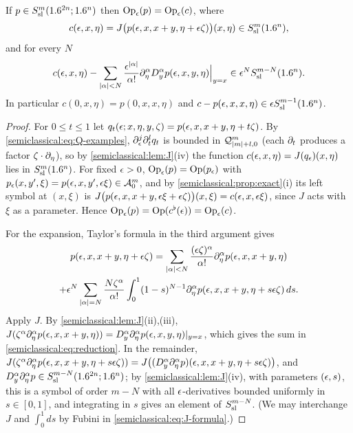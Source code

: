 \begin{theorem}[Reduction]\label{semiclassical:thm:reduction}
  If $p\in S^{m}_{\mathrm{sl}}(1.6^{2n};1.6^n)$ then $\operatorname{Op}_\epsilon(p)=\operatorname{Op}_\epsilon(c)$, where
  \begin{equation*}
    c(\epsilon,x,\eta)=J\bigl(p(\epsilon,x,x+y,\eta+\epsilon\zeta)\bigr)(x,\eta)\in S^{m}_{\mathrm{sl}}(1.6^n),
  \end{equation*}
  and for every $N$
  \begin{equation}\label{semiclassical:eq:reduction}
    c(\epsilon,x,\eta)-\sum_{\lvert \alpha\rvert<N}\frac{\epsilon^{\lvert \alpha\rvert}}{\alpha!}
    \partial^\alpha_\eta D^\alpha_yp(\epsilon,x,y,\eta)\Big|_{y=x}\in\epsilon^NS^{m-N}_{\mathrm{sl}}(1.6^n).
  \end{equation}
  In particular $c(0,x,\eta)=p(0,x,x,\eta)$ and $c-p(\epsilon,x,x,\eta)\in\epsilon S^{m-1}_{\mathrm{sl}}(1.6^n)$.
\end{theorem}
\begin{proof}
  For $0\le t\le1$ let $q_t(\epsilon;x,\eta,y,\zeta)=p(\epsilon,x,x+y,\eta+t\zeta)$. By
  \eqref{semiclassical:eq:Q-examples}, $\partial^j_\epsilon\partial^l_tq_t$ is bounded in
  $\mathcal{Q}^{m}_{\lvert m\rvert+l,0}$ (each $\partial_t$ produces a factor $\zeta\cdot\partial_\eta$), so by
  \cref{semiclassical:lem:J}(iv) the function $c(\epsilon,x,\eta)=J(q_\epsilon)(x,\eta)$
  lies in $S^{m}_{\mathrm{sl}}(1.6^n)$. For fixed $\epsilon>0$, $\operatorname{Op}_\epsilon(p)=\operatorname{Op}(p_\epsilon)$ with
  $p_\epsilon(x,y',\xi)=p(\epsilon,x,y',\epsilon\xi)\in\mathcal{A}^{m}_{0}$, and by
  \cref{semiclassical:prop:exact}(i) its left symbol at $(x,\xi)$ is
  $J\bigl(p(\epsilon,x,x+y,\epsilon\xi+\epsilon\zeta)\bigr)(x,\xi)=c(\epsilon,x,\epsilon\xi)$, since
  $J$ acts with $\xi$ as a parameter. Hence $\operatorname{Op}_\epsilon(p)=\operatorname{Op}(c^\flat(\epsilon))=\operatorname{Op}_\epsilon(c)$.

  For the expansion, Taylor's formula in the third argument gives
  \begin{multline*}
    p(\epsilon,x,x+y,\eta+\epsilon\zeta)=\sum_{\lvert \alpha\rvert<N}\frac{(\epsilon\zeta)^\alpha}{\alpha!}
    \partial^\alpha_\eta p(\epsilon,x,x+y,\eta)\\
    +\epsilon^N\sum_{\lvert \alpha\rvert=N}\frac{N\zeta^\alpha}{\alpha!}\int_0^1(1-s)^{N-1}
    \partial^\alpha_\eta p(\epsilon,x,x+y,\eta+s\epsilon\zeta)\,ds .
  \end{multline*}
  Apply $J$. By \cref{semiclassical:lem:J}(ii),(iii),
  $J(\zeta^\alpha\partial^\alpha_\eta p(\epsilon,x,x+y,\eta))=D^\alpha_y\partial^\alpha_\eta p(\epsilon,x,y,\eta)|_{y=x}$,
  which gives the sum in \eqref{semiclassical:eq:reduction}. In the remainder,
  $J(\zeta^\alpha\partial^\alpha_\eta p(\epsilon,x,x+y,\eta+s\epsilon\zeta))
  =J\bigl((D^\alpha_y\partial^\alpha_\eta p)(\epsilon,x,x+y,\eta+s\epsilon\zeta)\bigr)$, and
  $D^\alpha_y\partial^\alpha_\eta p\in S^{m-N}_{\mathrm{sl}}(1.6^{2n};1.6^n)$; by
  \cref{semiclassical:lem:J}(iv), with parameters $(\epsilon,s)$, this is a symbol of
  order $m-N$ with all $\epsilon$-derivatives bounded uniformly in $s\in[0,1]$, and
  integrating in $s$ gives an element of $S^{m-N}_{\mathrm{sl}}$. (We may interchange $J$
  and $\int_0^1ds$ by Fubini in \eqref{semiclassical:eq:J-formula}.)
\end{proof}

